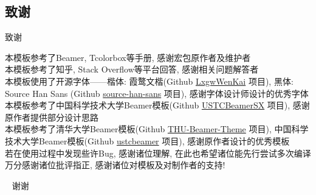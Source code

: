 \documentclass[hyperref,UTF8,11pt,CJK,handout]{beamer}
\begin{document}
\subsection{致谢}
\begin{frame}{致谢}
	\begin{center}
		本模板参考了Beamer, Tcolorbox等手册, 感谢宏包原作者及维护者\\[1ex]
		本模板参考了知乎, Stack Overflow等平台回答, 感谢相关问题解答者\\[1ex]
		本模板使用了开源字体——楷体: 霞鹜文楷(Github \href{https://github.com/lxgw/LxgwWenKai/}{\color{BSblue}LxgwWenKai} 项目), 黑体: Source Han Sans (Github \href{https://github.com/adobe-fonts/source-han-sans/}{\color{BSblue}source-han-sans} 项目), 感谢字体设计师设计的优秀字体\\[1ex]
		本模板参考了中国科学技术大学Beamer模板(Github \href{https://github.com/ysx2000/USTCBeamerSX/}{\color{BSblue}USTCBeamerSX} 项目), 感谢原作者提供部分设计思路\\[1ex]
		本模板参考了清华大学Beamer模板(Github \href{https://github.com/tuna/THU-Beamer-Theme/}{\color{BSblue}THU-Beamer-Theme} 项目), 中国科学技术大学Beamer模板(Github \href{https://github.com/ustctug/ustcbeamer/}{\color{BSblue}ustcbeamer} 项目), 感谢原作者设计的优秀模板\\[1ex]
		
		若在使用过程中发现些许Bug, 感谢诸位理解, 在此也希望诸位能先行尝试多次编译\\[1ex]
		万分感谢诸位批评指正, 感谢诸位对模板及对制作者的支持!
	\end{center}
\end{frame}

\begin{frame}{~}
	\centering
	\Huge 谢谢
\end{frame}
\end{document}
